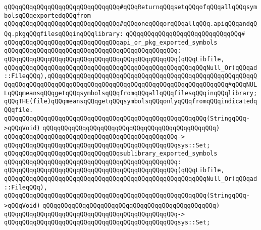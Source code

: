 \verb|qQQqqQQqqQQqqQQqqQQqqQQqqQQqqQQq#qQQqReturnqQQqsetqQQqofqQQqallqQQqsymbolsqQQqexportedqQQqfrom|\newline
\verb|qQQqqQQqqQQqqQQqqQQqqQQqqQQqqQQq#qQQqoneqQQqorqQQqallqQQq.apiqQQqandqQQq.pkgqQQqfilesqQQqinqQQqlibrary:|\newline
\verb|qQQqqQQqqQQqqQQqqQQqqQQqqQQqqQQq#|\newline
\verb|qQQqqQQqqQQqqQQqqQQqqQQqqQQqqQQqapi_or_pkg_exported_symbols|\newline
\verb|qQQqqQQqqQQqqQQqqQQqqQQqqQQqqQQqqQQqqQQqqQQqqQQq:|\newline
\verb|qQQqqQQqqQQqqQQqqQQqqQQqqQQqqQQqqQQqqQQqqQQqqQQq(qQQqLibfile,|\newline
\verb|qQQqqQQqqQQqqQQqqQQqqQQqqQQqqQQqqQQqqQQqqQQqqQQqqQQqqQQqNull_Or(qQQqad::FileqQQq),qQQqqQQqqQQqqQQqqQQqqQQqqQQqqQQqqQQqqQQqqQQqqQQqqQQqqQQqqQQqqQQqqQQqqQQqqQQqqQQqqQQqqQQqqQQqqQQqqQQqqQQqqQQqqQQqqQQqqQQq#qQQqNULLqQQqmeansqQQqgetqQQqsymbolsqQQqfromqQQqallqQQqfilesqQQqinqQQqlibrary;qQQqTHE(file)qQQqmeansqQQqgetqQQqsymbolsqQQqonlyqQQqfromqQQqindicatedqQQqfile.|\newline
\verb|qQQqqQQqqQQqqQQqqQQqqQQqqQQqqQQqqQQqqQQqqQQqqQQqqQQqqQQq(StringqQQq->qQQqVoid)|\newline
\verb|qQQqqQQqqQQqqQQqqQQqqQQqqQQqqQQqqQQqqQQqqQQqqQQq)|\newline
\verb|qQQqqQQqqQQqqQQqqQQqqQQqqQQqqQQqqQQqqQQqqQQqqQQq->|\newline
\verb|qQQqqQQqqQQqqQQqqQQqqQQqqQQqqQQqqQQqqQQqqQQqqQQqsys::Set;|\newline
\newline
\newline
\verb|qQQqqQQqqQQqqQQqqQQqqQQqqQQqqQQqsublibrary_exported_symbols|\newline
\verb|qQQqqQQqqQQqqQQqqQQqqQQqqQQqqQQqqQQqqQQqqQQqqQQq:|\newline
\verb|qQQqqQQqqQQqqQQqqQQqqQQqqQQqqQQqqQQqqQQqqQQqqQQq(qQQqLibfile,|\newline
\verb|qQQqqQQqqQQqqQQqqQQqqQQqqQQqqQQqqQQqqQQqqQQqqQQqqQQqqQQqNull_Or(qQQqad::FileqQQq),|\newline
\verb|qQQqqQQqqQQqqQQqqQQqqQQqqQQqqQQqqQQqqQQqqQQqqQQqqQQqqQQq(StringqQQq->qQQqVoid)|\newline
\verb|qQQqqQQqqQQqqQQqqQQqqQQqqQQqqQQqqQQqqQQqqQQqqQQq)|\newline
\verb|qQQqqQQqqQQqqQQqqQQqqQQqqQQqqQQqqQQqqQQqqQQqqQQq->|\newline
\verb|qQQqqQQqqQQqqQQqqQQqqQQqqQQqqQQqqQQqqQQqqQQqqQQqsys::Set;|\newline
